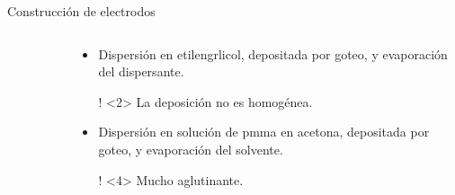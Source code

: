 \documentclass[aspectratio=169]{beamer}
\begin{document}
\begin{frame}{Construcción de electrodos}
\begin{columns}
\begin{column}{0.3\textwidth}
\begin{figure}
				\end{figure}
			\end{column}
			\begin{column}{0.6\textwidth}
				\begin{itemize}
					\item<1-2> Dispersión en etilengrlicol, depositada por goteo, y evaporación del dispersante.
					\item[!]<2> La deposición no es homogénea.
					\item<3-4> Dispersión en solución de pmma en acetona, depositada por goteo, y evaporación del solvente.
					\item[!]<4> Mucho aglutinante.
				\end{itemize}
			\end{column}
		\end{columns}		
	\end{frame}
\end{document}
